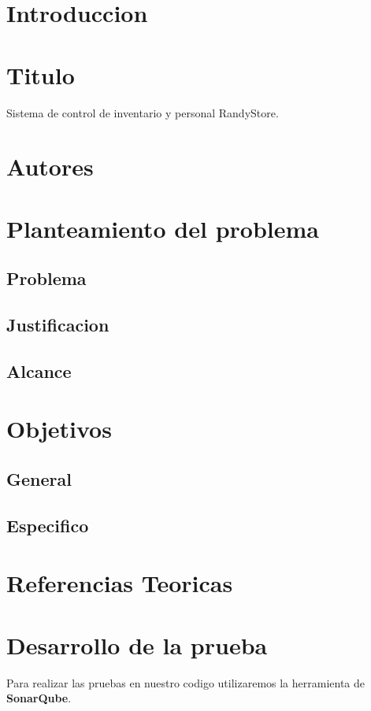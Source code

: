 \documentclass[12pt,letterpaper]{article}
\begin{document}
\section{Introduccion} 

\section{Titulo} 

Sistema de control de inventario y personal RandyStore.


\section{Autores} 


\section{Planteamiento del problema} 
    \subsection{Problema}

    \subsection{Justificacion}
    \subsection{Alcance}

\section{Objetivos}
    \subsection{General}
    \subsection{Especifico}

\section{Referencias Teoricas}

\section{Desarrollo de la prueba}
Para realizar las pruebas en nuestro codigo utilizaremos la herramienta
de \textbf{SonarQube}.
\end{document}
